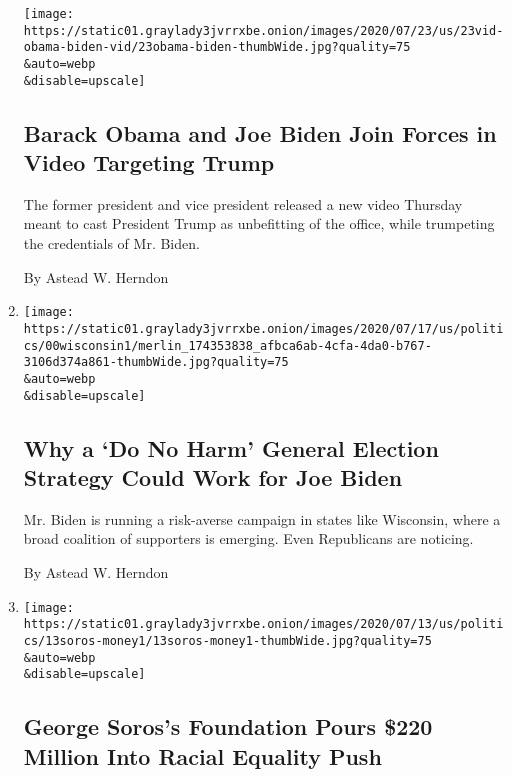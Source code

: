 \begin{enumerate}
  \texttt{[image: https://static01.graylady3jvrrxbe.onion/images/2020/07/23/us/23vid-obama-biden-vid/23obama-biden-thumbWide.jpg?quality=75\\\&auto=webp\\\&disable=upscale]}

  \hypertarget{barack-obama-and-joe-biden-join-forces-in-video-targeting-trump}{%
  \subsection{Barack Obama and Joe Biden Join Forces in Video Targeting
  Trump}\label{barack-obama-and-joe-biden-join-forces-in-video-targeting-trump}}

  The former president and vice president released a new video Thursday
  meant to cast President Trump as unbefitting of the office, while
  trumpeting the credentials of Mr. Biden.

  By Astead W. Herndon
\item
  \href{/2020/07/19/us/politics/joe-biden-wisconsin-election.html}{}

  \texttt{[image: https://static01.graylady3jvrrxbe.onion/images/2020/07/17/us/politics/00wisconsin1/merlin\_174353838\_afbca6ab-4cfa-4da0-b767-3106d374a861-thumbWide.jpg?quality=75\\\&auto=webp\\\&disable=upscale]}

  \hypertarget{why-a-do-no-harm-general-election-strategy-could-work-for-joe-biden}{%
  \subsection{Why a `Do No Harm' General Election Strategy Could Work
  for Joe
  Biden}\label{why-a-do-no-harm-general-election-strategy-could-work-for-joe-biden}}

  Mr. Biden is running a risk-averse campaign in states like Wisconsin,
  where a broad coalition of supporters is emerging. Even Republicans
  are noticing.

  By Astead W. Herndon
\item
  \href{/2020/07/13/us/politics/george-soros-racial-justice-organizations.html}{}

  \texttt{[image: https://static01.graylady3jvrrxbe.onion/images/2020/07/13/us/politics/13soros-money1/13soros-money1-thumbWide.jpg?quality=75\\\&auto=webp\\\&disable=upscale]}

  \hypertarget{george-soross-foundation-pours-220-million-into-racial-equality-push}{%
  \subsection{George Soros's Foundation Pours \$220 Million Into Racial
  Equality
  Push}\label{george-soross-foundation-pours-220-million-into-racial-equality-push}}


\end{enumerate}
